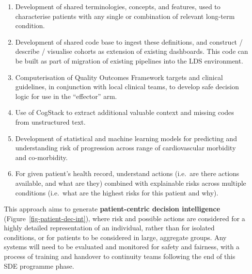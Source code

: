 \documentclass[
  letterpaper,
  DIV=11,
  numbers=noendperiod]{scrartcl}
\begin{document}
\begin{enumerate}
\def\labelenumi{(\arabic{enumi})}
\item
  Development of shared terminologies, concepts, and features, used to
  characterise patients with any single or combination of relevant
  long-term condition.
\item
  Development of shared code base to ingest these definitions, and
  construct / describe / visualise cohorts as extension of existing
  dashboards. This code can be built as part of migration of existing
  pipelines into the LDS environment.
\item
  Computerisation of Quality Outcomes Framework targets and clinical
  guidelines, in conjunction with local clinical teams, to develop safe
  decision logic for use in the ``effector'' arm.
\item
  Use of CogStack to extract additional valuable context and missing
  codes from unstructured text.
\item
  Development of statistical and machine learning models for predicting
  and understanding risk of progression across range of cardiovascular
  morbidity and co-morbidity.
\item
  For given patient's health record, understand actions (i.e.~are there
  actions available, and what are they) combined with explainable risks
  across multiple conditions (i.e.~what are the highest risks for this
  patient and why).
\end{enumerate}

This approach aims to generate \textbf{patient-centric decision
intelligence} (Figure~\ref{fig-patient-dec-int}), where risk and
possible actions are considered for a highly detailed representation of
an individual, rather than for isolated conditions, or for patients to
be considered in large, aggregate groups. Any systems will need to be
evaluated and monitored for safety and fairness, with a process of
training and handover to continuity teams following the end of this SDE
programme phase.
\end{document}
